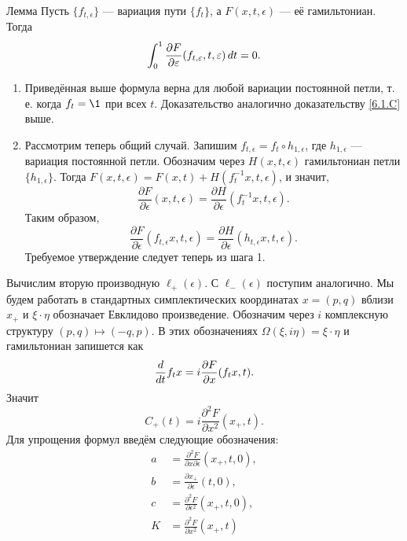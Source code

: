 \begin{thm}{Лемма}\label{12.4.B}
Пусть $\{f_{t,\epsilon}\}$ --- вариация пути $\{f_t\}$, а $F(x, t,\epsilon)$ --- её гамильтониан.
Тогда 
\[\int_0^1\frac{\partial F}{\partial \varepsilon}(f_{t,\varepsilon},t,\varepsilon)\,d t=0.\] 

\end{thm}

\begin{enumerate}[1)]
\item Приведённая выше формула верна для любой вариации постоянной петли, т. е. когда $f_t = \1$ при всех $t$.
Доказательство аналогично доказательству \ref{6.1.C} выше.
\item Рассмотрим теперь общий случай.
Запишим $f_{t,\epsilon} = f_t \circ h_{1,\epsilon}$, где $h_{1,\epsilon}$ --- вариация постоянной петли.
Обозначим через $H(x, t, \epsilon)$ гамильтониан петли $\{h_{1,\epsilon}\}$.
Тогда $F(x,t,\epsilon) = F(x,t) + H(f_t^{-1}x,t,\epsilon)$, и значит, 
\[\frac{\partial F}{\partial \epsilon}(x,t,\epsilon)=\frac{\partial H}{\partial \epsilon}(f_t^{-1}x,t,\epsilon).\]
Таким образом,
\[\frac{\partial F}{\partial \epsilon}(f_{t,\epsilon}x,t,\epsilon)=\frac{\partial H}{\partial \epsilon}(h_{t,\epsilon}x,t,\epsilon).\]
Требуемое утверждение следует теперь из шага 1.
\end{enumerate}


Вычислим вторую производную $\ell_+(\epsilon)$.
С $\ell_-(\epsilon)$ поступим аналогично.
Мы будем работать в стандартных симплектических координатах $x = (p, q)$ вблизи $x_+$ и $\xi\cdot\eta$ обозначает Евклидово  произведение.
Обозначим через $i$ комплексную структуру $(p, q) \mapsto (-q, p)$.
В этих обозначениях $\Omega(\xi, i\eta) = \xi\cdot\eta$ и гамильтониан запишется как
\[\frac{d}{d t}f_tx=i\frac{\partial F}{\partial x}(f_tx,t).\]
Значит
\[C_+(t)=i\frac{\partial^2F}{\partial x^2}(x_+,t).\]
Для упрощения формул введём следующие обозначения: 
\begin{align*}
a&=\frac{\partial^2 F}{\partial x\partial\epsilon}(x_+,t,0),
\\
b&=\frac{\partial x_+}{\partial\epsilon}(t,0),
\\
c&=\frac{\partial^2 F}{\partial\epsilon^2}(x_+,t,0),
\\
K&=\frac{\partial^2 F}{\partial x^2}(x_+,t)
\end{align*}

